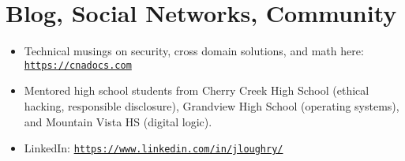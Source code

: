\section*{Blog, Social Networks, Community}
\vspace{-2mm}

\begin{itemize}
    \item Technical musings on security, cross domain solutions, and math
        here:
        \href{https://cnadocs.com}{\nolinkurl{https://cnadocs.com}}\vspace{-1mm}
    \item Mentored high school students from Cherry Creek High School
        (ethical hacking, responsible disclosure), Grandview High School
        (operating systems), and Mountain Vista HS (digital logic).\vspace{-1mm}
    \item LinkedIn:
        \href{https://www.linkedin.com/in/jloughry/}{\nolinkurl{https://www.linkedin.com/in/jloughry/}}
\end{itemize}

